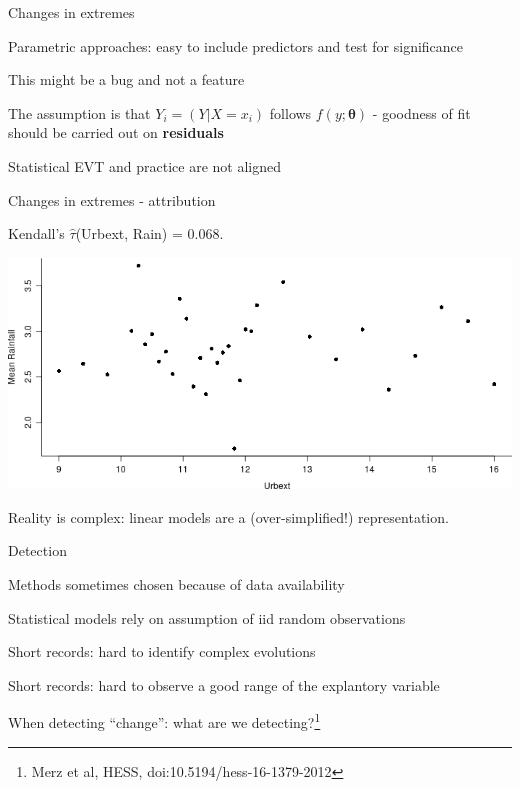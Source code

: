 \documentclass[
  10pt,
  ignorenonframetext,
  compress]{beamer}
\begin{document}
\begin{frame}{Changes in extremes}
\protect\hypertarget{changes-in-extremes}{}

Parametric approaches: easy to include predictors and test for
significance

\pause

This might be a bug and not a feature

\pause

The assumption is that \(Y_i=(Y|X = x_i)\) follows
\(f(y; \boldsymbol \theta)\) - goodness of fit should be carried out on
\textbf{residuals}

Statistical EVT and practice are not aligned

\end{frame}

\begin{frame}{Changes in extremes - attribution}
\protect\hypertarget{changes-in-extremes---attribution}{}

Kendall's \(\hat{\tau}\)(Urbext, Rain) = 0.068.

\includegraphics{ProsdocimiPerugia_files/figure-beamer/urbAndRain-1.png}

\pause

Reality is complex: linear models are a (over-simplified!)
representation.

\end{frame}

\begin{frame}{Detection}
\protect\hypertarget{detection}{}

Methods sometimes chosen because of data availability

Statistical models rely on assumption of iid random observations

Short records: hard to identify complex evolutions

Short records: hard to observe a good range of the explantory variable

When detecting ``change'': what are we
detecting?\footnote{Merz et al, HESS, doi:10.5194/hess-16-1379-2012}

\end{frame}
\end{document}
